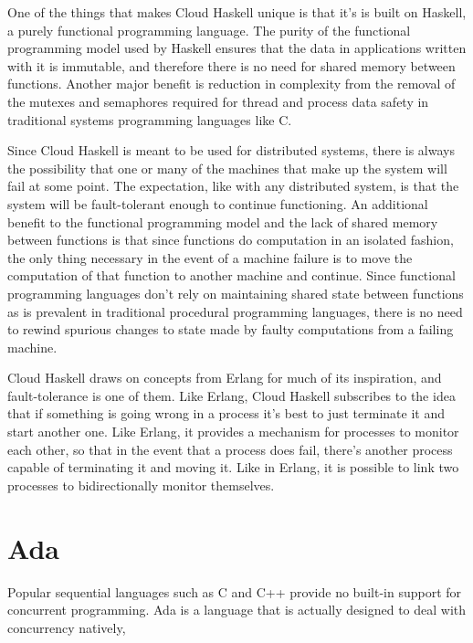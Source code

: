\documentclass[10pt,a4paper,twocolumn]{article}
\begin{document}
One of the things that makes Cloud Haskell unique is that it's is built on
Haskell, a purely functional programming language. The purity of the functional
programming model used by Haskell ensures that the data in applications written
with it is immutable, and therefore there is no need for shared memory between
functions. Another major benefit is reduction in complexity from the removal of
the mutexes and semaphores required for thread and process data safety in
traditional systems programming languages like C.

Since Cloud Haskell is meant to be used for distributed systems, there is always
the possibility that one or many of the machines that make up the system will
fail at some point. The expectation, like with any distributed system, is that
the system will be fault-tolerant enough to continue functioning. An additional
benefit to the functional programming model and the lack of shared memory
between functions is that since functions do computation in an isolated fashion,
the only thing necessary in the event of a machine failure is to move the
computation of that function to another machine and continue. Since functional
programming languages don't rely on maintaining shared state between functions
as is prevalent in traditional procedural programming languages, there is no
need to rewind spurious changes to state made by faulty computations from a
failing machine.

Cloud Haskell draws on concepts from Erlang for much of its inspiration, and
fault-tolerance is one of them. Like Erlang, Cloud Haskell subscribes to the
idea that if something is going wrong in a process it's best to just terminate
it and start another one. Like Erlang, it provides a mechanism for processes to
monitor each other, so that in the event that a process does fail, there's
another process capable of terminating it and moving it. Like in Erlang, it is
possible to link two processes to bidirectionally monitor themselves.


\section{Ada}

Popular sequential languages such as C and C++ provide no built-in support for
concurrent programming. Ada is a language that is actually designed to deal with
concurrency natively,
\end{document}
